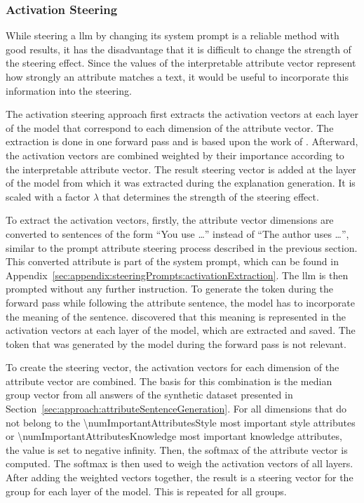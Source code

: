 \subsubsection{Activation Steering}
\label{sec:experiments:setup:steering:activation}
While steering a \ac{llm} by changing its system prompt is a reliable method with good results, it has the disadvantage that it is difficult to change the strength of the steering effect. Since the values of the interpretable attribute vector represent how strongly an attribute matches a text, it would be useful to incorporate this information into the steering.

The activation steering approach first extracts the activation vectors at each layer of the model that correspond to each dimension of the attribute vector. The extraction is done in one forward pass and is based upon the work of \citet{konenStyleVectorsSteering2024}. %
Afterward, the activation vectors are combined weighted by their importance according to the interpretable attribute vector. The result steering vector is added at the layer of the model from which it was extracted during the explanation generation. It is scaled with a factor \(\lambda\) that determines the strength of the steering effect.

To extract the activation vectors, firstly, the attribute vector dimensions are converted to sentences of the form \enquote{You use \ldots} instead of \enquote{The author uses \ldots}, similar to the prompt attribute steering process described in the previous section. This converted attribute is part of the system prompt, which can be found in Appendix~\ref{sec:appendix:steeringPrompts:activationExtraction}. The \ac{llm} is then prompted without any further instruction. To generate the token during the forward pass while following the attribute sentence, the model has to incorporate the meaning of the sentence. \citet{konenStyleVectorsSteering2024} discovered that this meaning is represented in the activation vectors at each layer of the model, which are extracted and saved. The token that was generated by the model during the forward pass is not relevant.

To create the steering vector, the activation vectors for each dimension of the attribute vector are combined. The basis for this combination is the median group vector from all answers of the synthetic dataset presented in Section~\ref{sec:approach:attributeSentenceGeneration}. For all dimensions that do not belong to the \num{\numImportantAttributesStyle} most important style attributes or \num{\numImportantAttributesKnowledge} most important knowledge attributes, the value is set to negative infinity. Then, the softmax of the attribute vector is computed. The softmax is then used to weigh the activation vectors of all layers. After adding the weighted vectors together, the result is a steering vector for the group for each layer of the model. This is repeated for all groups.
